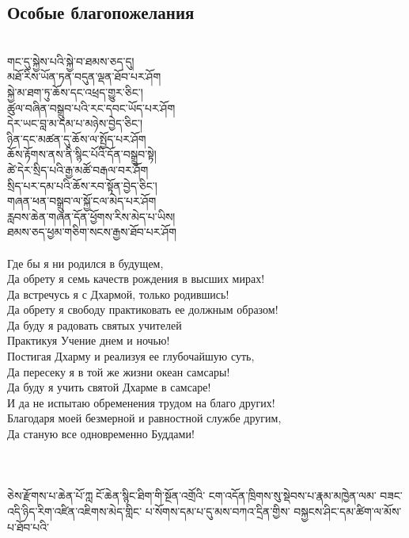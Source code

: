 \subsection{Особые благопожелания}
\\
\ti
གང་དུ་སྐྱེས་པའི་སྐྱེ་བ་ཐམས་ཅད་དུ།\\
མཐོ་རིས་ཡོན་ཏན་བདུན་ལྡན་ཐོབ་པར་ཤོག\\
སྐྱེ་མ་ཐག་ཏུ་ཆོས་དང་འཕྲད་གྱུར་ཅིང༌།\\
ཚུལ་བཞིན་བསྒྲུབ་པའི་རང་དབང་ཡོད་པར་ཤོག\\
དེར་ཡང་བླ་མ་དམ་པ་མཉེས་བྱེད་ཅིང༌། \\
ཉིན་དང་མཚན་དུ་ཆོས་ལ་སྤྱོད་པར་ཤོག\\
ཆོས་རྟོགས་ནས་ནི་སྙིང་པོའི་དོན་བསྒྲུབ་སྟེ།\\
ཚེ་དེར་སྲིད་པའི་རྒྱ་མཚོ་བརྒལ་བར་ཤོག \\
སྲིད་པར་དམ་པའི་ཆོས་རབ་སྟོན་བྱེད་ཅིང༌།\\
གཞན་ཕན་བསྒྲུབ་ལ་སྐྱོ་ངལ་མེད་པར་ཤོག\\
རླབས་ཆེན་གཞན་དོན་ཕྱོགས་རིས་མེད་པ་ཡིས།\\
ཐམས་ཅད་ཕྱམ་གཅིག་སངས་རྒྱས་ཐོབ་པར་ཤོག\\
\\
\ru Где бы я ни родился в будущем,\\
Да обрету я семь качеств рождения в высших мирах!\\
Да встречусь я с Дхармой, только родившись!\\
Да обрету я свободу практиковать ее должным образом!\\
Да буду я радовать святых учителей\\
Практикуя Учение днем и ночью!\\
Постигая Дхарму и реализуя ее глубочайшую суть,\\
Да пересеку я в той же жизни океан самсары!\\
Да буду я учить святой Дхарме в самсаре!\\
И да не испытаю обременения трудом на благо других!\\
Благодаря моей безмерной и равностной службе другим,\\
Да станую все одновременно Буддами!\\
\\
\\
\\
\newpage
\ti\scriptsize ཅེས་རྫོགས་པ་ཆེན་པོ་ཀླ
ོང་ཆེན་སྙིང་ཐིག་གི་སྔོན་འགྲོའི་
ངག་འདོན་ཁྲིགས་སུ་སྡེབས་པ་རྣམ་མཁྱེན་ལམ་
བཟང་འདི་ཉིད་རིག་འཛིན་འཇིགས་མེད་གླིང་
པ་སོགས་དམ་པ་དུ་མས་བཀའ་དྲིན་གྱིས་
བསྐྱངས་ཤིང་དམ་ཚིག་ལ་མོས་པ་ཐོབ་པའི་
